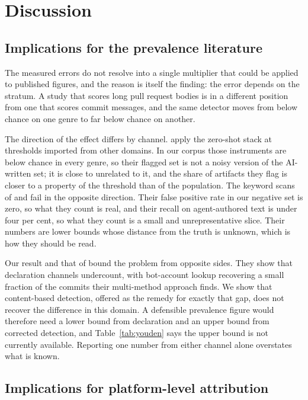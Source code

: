 \section{Discussion}
\label{sec:discussion}

\subsection{Implications for the prevalence literature}
\label{sec:discussion:prevalence}

The measured errors do not resolve into a single multiplier that could be applied to
published figures, and the reason is itself the finding: the error depends on the
stratum. A study that scores long pull request bodies is in a different position from
one that scores commit messages, and the same detector moves from below chance on one
genre to far below chance on another.

The direction of the effect differs by channel. \citet{ji2026exploratory} apply the
zero-shot stack at thresholds imported from other domains. In our corpus those
instruments are below chance in every genre, so their flagged set is not a noisy version
of the AI-written set; it is close to unrelated to it, and the share of artifacts they
flag is closer to a property of the threshold than of the population. The keyword scans
of \citet{mao2026measurement} and \citet{almujahid2026aiusage} fail in the opposite
direction. Their false positive rate in our negative set is zero, so what they count is
real, and their recall on agent-authored text is under four per cent, so what they count
is a small and unrepresentative slice. Their numbers are lower bounds whose distance
from the truth is unknown, which is how they should be read.

Our result and that of \citet{khosravani2026census} bound the problem from opposite
sides. They show that declaration channels undercount, with bot-account lookup
recovering a small fraction of the commits their multi-method approach finds. We show
that content-based detection, offered as the remedy for exactly that gap, does not
recover the difference in this domain. A defensible prevalence figure would therefore
need a lower bound from declaration and an upper bound from corrected detection, and
Table~\ref{tab:youden} says the upper bound is not currently available. Reporting one
number from either channel alone overstates what is known.

\subsection{Implications for platform-level attribution}
\label{sec:discussion:platform}

